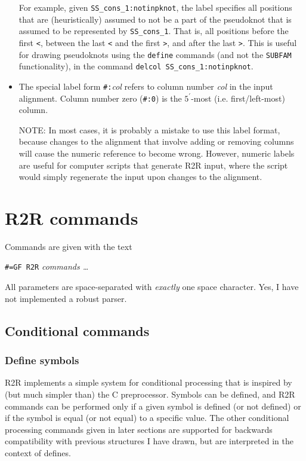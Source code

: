 \documentclass[letterpaper,12pt]{report}
\begin{document}
\begin{itemize}
For example, given {\tt SS\_cons\_1:notinpknot}, the label specifies all positions that are
(heuristically) assumed to not be a part of the pseudoknot that is assumed to be
represented by {\tt SS\_cons\_1}.  That is, all positions before the first {\tt \textless},
between the last {\tt \textless} and the first {\tt \textgreater}, and after the last {\tt \textgreater}.
This is useful for drawing pseudoknots using the {\tt define} commands (and not the {\tt SUBFAM} functionality),
in the command {\tt delcol SS\_cons\_1:notinpknot}.
\item \label{alignPosLabel}The special label form {\tt \#:}{\it col} refers to column number {\it col} in the input alignment.  Column number zero ({\tt \#:0}) is the $5^\prime$-most (i.e. first/left-most) column.

NOTE: In most cases, it is probably a mistake to use this label format, because changes to the alignment that involve adding or removing columns will cause the numeric reference to become wrong.  However, numeric labels are useful for computer scripts that generate R2R input, where the script would simply regenerate the input upon changes to the alignment.

\end{itemize}
\section{R2R commands}
Commands are given with the text

{\tt \#=GF R2R} \textit{commands {\dots}}

All parameters are space-separated with {\em exactly} one space character.  Yes, I have not implemented a robust parser.

\subsection{Conditional commands}
\label{conditionals}

\subsubsection{Define symbols}

R2R implements a simple system for conditional processing that is inspired by (but much simpler than)
the C preprocessor.
Symbols can be defined, and R2R commands can be performed only if a given symbol is defined (or not defined)
or if the symbol is equal (or not equal) to a specific value.
The other conditional processing commands given in later sections are supported for backwards compatibility with
previous structures I have drawn, but are interpreted in the context of defines.
\end{document}
